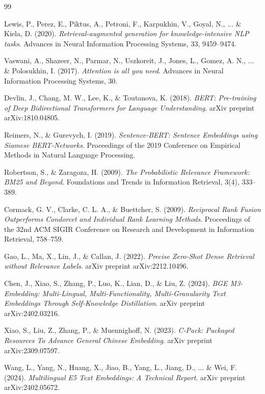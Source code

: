 \documentclass[../DoAn.tex]{subfiles}
\begin{document}
\begin{thebibliography}{99}

Lewis, P., Perez, E., Piktus, A., Petroni, F., Karpukhin, V., Goyal, N., ... \& Kiela, D. (2020). 
\textit{Retrieval-augmented generation for knowledge-intensive NLP tasks}. 
Advances in Neural Information Processing Systems, 33, 9459--9474.

Vaswani, A., Shazeer, N., Parmar, N., Uszkoreit, J., Jones, L., Gomez, A. N., ... \& Polosukhin, I. (2017). 
\textit{Attention is all you need}. 
Advances in Neural Information Processing Systems, 30.

Devlin, J., Chang, M. W., Lee, K., \& Toutanova, K. (2018). 
\textit{BERT: Pre-training of Deep Bidirectional Transformers for Language Understanding}. 
arXiv preprint arXiv:1810.04805.

Reimers, N., \& Gurevych, I. (2019). 
\textit{Sentence-BERT: Sentence Embeddings using Siamese BERT-Networks}. 
Proceedings of the 2019 Conference on Empirical Methods in Natural Language Processing.

Robertson, S., \& Zaragoza, H. (2009). 
\textit{The Probabilistic Relevance Framework: BM25 and Beyond}. 
Foundations and Trends in Information Retrieval, 3(4), 333--389.

Cormack, G. V., Clarke, C. L. A., \& Buettcher, S. (2009). 
\textit{Reciprocal Rank Fusion Outperforms Condorcet and Individual Rank Learning Methods}. 
Proceedings of the 32nd ACM SIGIR Conference on Research and Development in Information Retrieval, 758--759.

Gao, L., Ma, X., Lin, J., \& Callan, J. (2022). 
\textit{Precise Zero-Shot Dense Retrieval without Relevance Labels}. 
arXiv preprint arXiv:2212.10496.

Chen, J., Xiao, S., Zhang, P., Luo, K., Lian, D., \& Liu, Z. (2024). 
\textit{BGE M3-Embedding: Multi-Lingual, Multi-Functionality, Multi-Granularity Text Embeddings Through Self-Knowledge Distillation}. 
arXiv preprint arXiv:2402.03216.

Xiao, S., Liu, Z., Zhang, P., \& Muennighoff, N. (2023). 
\textit{C-Pack: Packaged Resources To Advance General Chinese Embedding}. 
arXiv preprint arXiv:2309.07597.

Wang, L., Yang, N., Huang, X., Jiao, B., Yang, L., Jiang, D., ... \& Wei, F. (2024). 
\textit{Multilingual E5 Text Embeddings: A Technical Report}. 
arXiv preprint arXiv:2402.05672.


\end{thebibliography}
\end{document}
